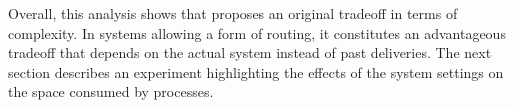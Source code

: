 Overall, this analysis shows that \RPCBROADCAST proposes an original tradeoff in
terms of complexity. In systems allowing a form of routing, it constitutes an
advantageous tradeoff that depends on the actual system instead of past
deliveries. The next section describes an experiment highlighting the effects of
the system settings on the space consumed by processes.

